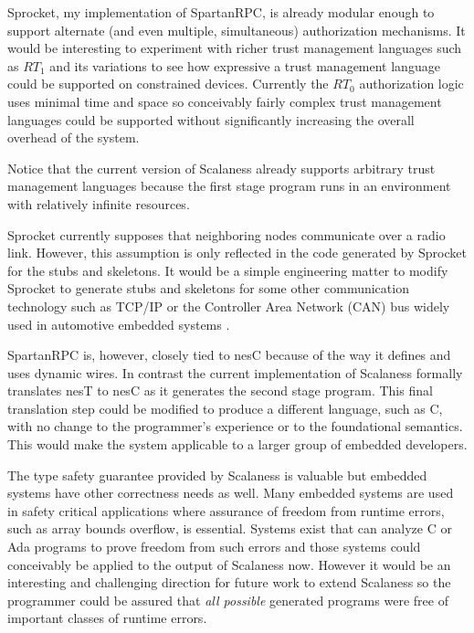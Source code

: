 Sprocket, my implementation of SpartanRPC, is already modular enough to support alternate (and
even multiple, simultaneous) authorization mechanisms. It would be interesting to experiment
with richer trust management languages such as $RT_1$ and its variations to see how expressive a
trust management language could be supported on constrained devices. Currently the $RT_0$
authorization logic uses minimal time and space so conceivably fairly complex trust management
languages could be supported without significantly increasing the overall overhead of the
system.

Notice that the current version of Scalaness already supports arbitrary trust management
languages because the first stage program runs in an environment with relatively infinite
resources.

Sprocket currently supposes that neighboring nodes communicate over a radio link. However, this
assumption is only reflected in the code generated by Sprocket for the stubs and skeletons. It
would be a simple engineering matter to modify Sprocket to generate stubs and skeletons for some
other communication technology such as TCP/IP or the Controller Area Network (CAN) bus widely
used in automotive embedded systems \cite{XXX}.

SpartanRPC is, however, closely tied to nesC because of the way it defines and uses dynamic
wires. In contrast the current implementation of Scalaness formally translates nesT to nesC as
it generates the second stage program. This final translation step could be modified to produce
a different language, such as C, with no change to the programmer's experience or to the
foundational semantics. This would make the system applicable to a larger group of embedded
developers.

The type safety guarantee provided by Scalaness is valuable but embedded systems have other
correctness needs as well. Many embedded systems are used in safety critical applications where
assurance of freedom from runtime errors, such as array bounds overflow, is essential. Systems
exist that can analyze C or Ada programs to prove freedom from such errors \cite{XXX,XXX} and
those systems could conceivably be applied to the output of Scalaness now. However it would be
an interesting and challenging direction for future work to extend Scalaness so the programmer
could be assured that \emph{all possible} generated programs were free of important classes of
runtime errors.

